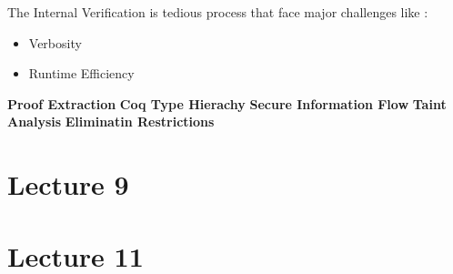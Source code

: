 \documentclass[paper=a4, fontsize=11pt]{scrartcl}
\numberwithin{equation}{section}		%
\numberwithin{figure}{section}			%
\numberwithin{table}{section}				%
\begin{document}
The Internal Verification is tedious process that face major challenges like :

\begin{itemize}
	\item{Verbosity}
	\item{Runtime Efficiency} 
\end{itemize}

\textbf{Proof Extraction}
\textbf{Coq Type Hierachy}
\textbf{Secure Information Flow}
\textbf{Taint Analysis}
\textbf{Eliminatin Restrictions}


\section{Lecture 9}
\section{Lecture 11}
\end{document}
